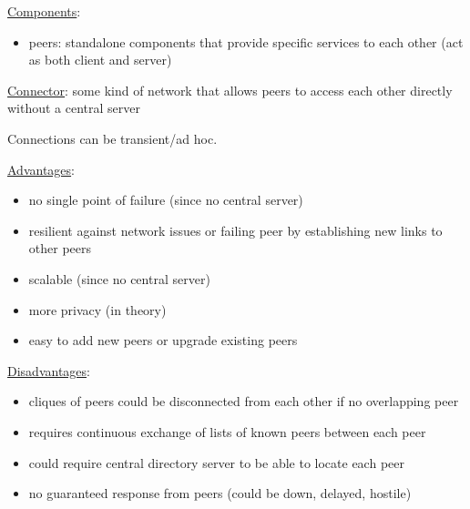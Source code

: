 \documentclass[11pt]{article}
\begin{document}
\uline{Components}:
\begin{itemize}
\item peers: standalone components that provide specific services to each
other (act as both client and server)
\end{itemize}

\uline{Connector}: some kind of network that allows peers to access each other
directly without a central server

Connections can be transient/ad hoc.

\uline{Advantages}:
\begin{itemize}
\item no single point of failure (since no central server)
\item resilient against network issues or failing peer by establishing
new links to other peers
\item scalable (since no central server)
\item more privacy (in theory)
\item easy to add new peers or upgrade existing peers
\end{itemize}

\uline{Disadvantages}:
\begin{itemize}
\item cliques of peers could be disconnected from each other if no overlapping
peer
\item requires continuous exchange of lists of known peers between each peer
\item could require central directory server to be able to locate each peer
\item no guaranteed response from peers (could be down, delayed, hostile)
\end{itemize}
\end{document}

